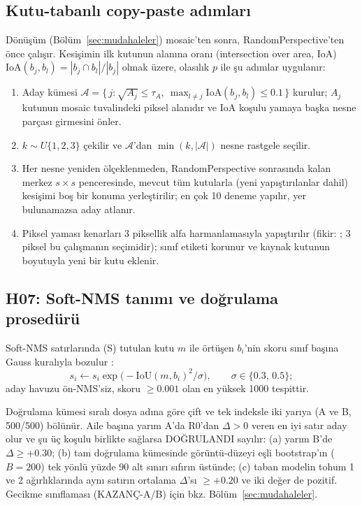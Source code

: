 \subsection{Kutu-tabanlı copy-paste adımları}\label{sec:ek-cp}
Dönüşüm (Bölüm~\ref{sec:mudahaleler}) mosaic'ten sonra, RandomPerspective'ten önce çalışır. Kesişimin ilk kutunun alanına oranı (intersection over area, IoA) $\mathrm{IoA}(b_j,b_l)=|b_j\cap b_l|/|b_j|$ olmak üzere, olasılık $p$ ile şu adımlar uygulanır:
\begin{enumerate}
\item Aday kümesi $\mathcal A=\{\,j:\sqrt{A_j}\le\tau_A,\ \max_{l\ne j}\mathrm{IoA}(b_j,b_l)\le0.1\,\}$ kurulur; $A_j$ kutunun mosaic tuvalindeki piksel alanıdır ve IoA koşulu yamaya başka nesne parçası girmesini önler.
\item $k\sim U\{1,2,3\}$ çekilir ve $\mathcal A$'dan $\min(k,|\mathcal A|)$ nesne rastgele seçilir.
\item Her nesne yeniden ölçeklenmeden, RandomPerspective sonrasında kalan merkez $s\times s$ penceresinde, mevcut tüm kutularla (yeni yapıştırılanlar dahil) kesişimi boş bir konuma yerleştirilir; en çok 10 deneme yapılır, yer bulunamazsa aday atlanır.
\item Piksel yaması kenarları 3 piksellik alfa harmanlamasıyla yapıştırılır (fikir: \cite{dwibedi_2017_cutpaste}; 3 piksel bu çalışmanın seçimidir); sınıf etiketi korunur ve kaynak kutunun boyutuyla yeni bir kutu eklenir.
\end{enumerate}

\subsection{H07: Soft-NMS tanımı ve doğrulama prosedürü}\label{sec:ek-h07-dogrulama}
Soft-NMS satırlarında (S) tutulan kutu $m$ ile örtüşen $b_i$'nin skoru sınıf başına Gauss kuralıyla bozulur \cite{bodla_2017_softnms}:
\begin{equation}\label{eq:softnms}
s_i\leftarrow s_i\exp\!\bigl(-\mathrm{IoU}(m,b_i)^2/\sigma\bigr),\qquad\sigma\in\{0.3,\,0.5\};
\end{equation}
aday havuzu ön-NMS'siz, skoru $\ge0.001$ olan en yüksek 1000 tespittir.

Doğrulama kümesi sıralı dosya adına göre çift ve tek indeksle iki yarıya (A ve B, 500/500) bölünür. Aile başına yarım A'da R0'dan $\Delta>0$ veren en iyi satır aday olur ve şu üç koşulu birlikte sağlarsa DOĞRULANDI sayılır: (a) yarım B'de $\Delta\ge+0.30$; (b) tam doğrulama kümesinde görüntü-düzeyi eşli bootstrap'ın ($B=200$) tek yönlü yüzde 90 alt sınırı sıfırın üstünde; (c) taban modelin tohum 1 ve 2 ağırlıklarında aynı satırın ortalama $\Delta$'sı $\ge+0.20$ ve iki değer de pozitif. Gecikme sınıflaması (KAZANÇ-A/B) için bkz. Bölüm~\ref{sec:mudahaleler}.

